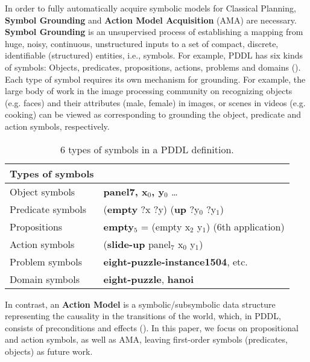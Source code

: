 \documentclass[11pt]{article}
\begin{document}
In order to fully automatically acquire symbolic models for Classical Planning, 
\textbf{Symbol Grounding} and \textbf{Action Model Acquisition} (AMA) are necessary.
%
\textbf{Symbol Grounding} is an unsupervised process of establishing a mapping
from huge, noisy, continuous, unstructured inputs
to a set of compact, %
discrete, identifiable (structured) entities, i.e., symbols.
For example, PDDL has six kinds of symbols: Objects, predicates, propositions, actions, problems and domains ().
Each type of symbol requires its own mechanism for grounding.
For example, the large body of work in the image processing community on recognizing 
objects (e.g. faces) and their attributes (male, female) in images, or scenes in videos (e.g. cooking)
can be viewed as corresponding to grounding the object, predicate and action symbols, respectively.

\begin{table}[tbp] 
\centering
\begin{tabular}{ll}
Types of symbols & \\
\hline
Object symbols    & \textbf{panel7, x\(_{\text{0}}\), y\(_{\text{0}}\)} \ldots{}               \\
Predicate symbols & (\textbf{empty} ?x ?y) (\textbf{up} ?y\(_{\text{0}}\) ?y\(_{\text{1}}\))   \\
Propositions      & \textbf{empty\(_{\text{5}}\)} = (empty x\(_{\text{2}}\) y\(_{\text{1}}\)) (6th application) \\
Action symbols    & (\textbf{slide-up} panel\(_{\text{7}}\) x\(_{\text{0}}\) y\(_{\text{1}}\)) \\
Problem symbols   & \textbf{eight-puzzle-instance1504}, etc.                                   \\
Domain  symbols   & \textbf{eight-puzzle}, \textbf{hanoi}                                      \\
\hline
\end{tabular}
\caption{6 types of symbols in a PDDL definition.}
\label{tab:type-of-symbols}
\end{table}

In contrast, an \textbf{Action Model} is a %
symbolic/subsymbolic data structure representing the causality in the transitions of the world,
which, in PDDL, consists of preconditions and effects (). %
In this paper, we focus on propositional and action symbols, as well as AMA, leaving first-order symbols (predicates, objects) as future work.
\end{document}
